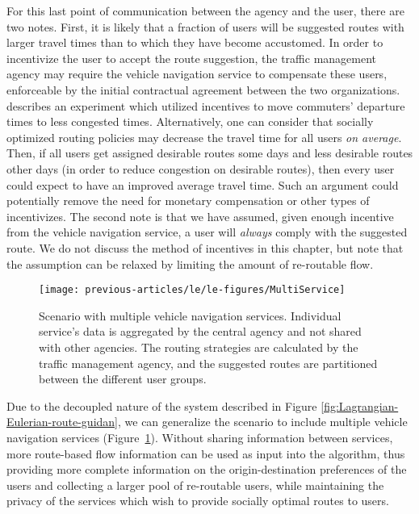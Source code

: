 For this last point of communication between the agency and the user,
there are two notes. First, it is likely that a fraction of users
will be suggested routes with larger travel times than to which they
have become accustomed. In order to incentivize the user to accept
the route suggestion, the traffic management agency may require the
vehicle navigation service to compensate these users, enforceable
by the initial contractual agreement between the two organizations.
\cite{Merugu2009} describes an experiment which utilized incentives
to move commuters' departure times to less congested times. Alternatively,
one can consider that socially optimized routing policies may decrease
the travel time for all users \emph{on average}. Then, if all users
get assigned desirable routes some days and less desirable routes
other days (in order to reduce congestion on desirable routes), then
every user could expect to have an improved average travel time. Such
an argument could potentially remove the need for monetary compensation
or other types of incentivizes. The second note is that we have assumed,
given enough incentive from the vehicle navigation service, a user
will \emph{always} comply with the suggested route. We do not discuss
the method of incentives in this chapter, but note that the assumption
can be relaxed by limiting the amount of re-routable flow.
\begin{figure}[h]
\centering
\texttt{[image: previous-articles/le/le-figures/MultiService]}%
\caption[Scenario with multiple vehicle navigation services. Individual service's
data is aggregated by the central agency and not shared with other
agencies.]{Scenario with multiple vehicle navigation services. Individual service's
data is aggregated by the central agency and not shared with other
agencies. The routing strategies are calculated by the traffic management
agency, and the suggested routes are partitioned between the different
user groups.}
\label{fig:Scenario-with-multiple}
\end{figure}


Due to the decoupled nature of the system described in Figure \ref{fig:Lagrangian-Eulerian-route-guidan},
we can generalize the scenario to include multiple vehicle navigation
services (Figure~\ref{fig:Scenario-with-multiple}). Without sharing
information between services, more route-based flow information can
be used as input into the algorithm, thus providing more complete
information on the origin-destination preferences of the users and
collecting a larger pool of re-routable users, while maintaining the
privacy of the services which wish to provide socially optimal routes
to users.


